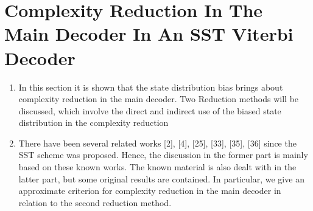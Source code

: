 \documentclass[fontsize=12pt]{article}
\theoremstyle{definition}
\begin{document}
\section{Complexity Reduction In The Main Decoder In An SST Viterbi Decoder}
\begin{enumerate}
\item In this section it is shown that the state distribution bias brings about complexity reduction in the main decoder. Two Reduction methods will be discussed, which involve the direct and indirect use of the biased state distribution in the complexity reduction

\item There have been several
related works [2], [4], [25], [33], [35], [36] since the SST
scheme was proposed. Hence, the discussion in the former part
is mainly based on these known works. The known material
is also dealt with in the latter part, but some original results
are contained. In particular, we give an approximate criterion
for complexity reduction in the main decoder in relation to
the second reduction method.
\end{enumerate}
\end{document}
